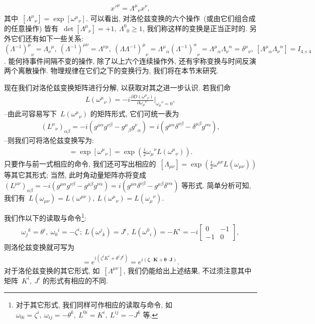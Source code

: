 \begin{align}
x'^\mu={\Lambda^\mu}_\nu x^\nu,
\end{align}
其中~$[{\Lambda^\mu}_\nu]=\exp[{\omega^\mu}_\nu]$.
%
%
可以看出, 对洛伦兹变换的六个操作~(或由它们组合成的任意操作) 皆有~$\det[{\Lambda^\mu}_\nu]=+1,~{\Lambda^0}_0\geq1$, 我们称这样的变换是正当正时的. 另外它们还有如下一些关系: ${(\Lambda^{-1})^\mu}_\nu={\Lambda_\nu}^\mu,~(\Lambda^{-1})^{\mu\nu}=\Lambda^{\nu\mu},~{(\Lambda\Lambda^{-1})^\mu}_\nu=
{\Lambda^\mu}_\alpha{(\Lambda^{-1})^\alpha}_\nu={\Lambda^\mu}_\alpha{\Lambda_\nu}^\alpha={\delta^\mu}_\nu,~[{\Lambda^\mu}_\alpha{\Lambda_\nu}^\alpha]=I_{4\times4}$.
%
能何持事件间隔不变的操作, 除了以上六个连续操作外, 还有宇称变换与时间反演两个离散操作. 物理规律在它们之下的变换行为, 我们将在本节末研究.


现在我们对洛伦兹变换矩阵进行分解, 以获取对其之进一步认识. 若我们命
\begin{gather}
L({\omega^\mu}_\nu)=-i\frac{\partial D({\omega^\mu}_\nu)}{\partial{\omega_\mu}^\nu}\Big|_{{\omega_\mu}^\nu=0},
\end{gather}
--由此可容易写下~$L({\omega^\mu}_\nu)$ 的矩阵形式, 它们可统一表为
\begin{gather}
({L^\mu}_\nu)_{\alpha\beta}=-i(g^{\mu\alpha}g^{\nu\beta}-{g^\mu}_\beta{g^\nu}_\alpha)=i(g^{\mu\alpha}\delta^{\nu\beta}-\delta^{\mu\beta}g^{\nu\alpha}),
\end{gather}
--则我们可将洛伦兹变换写为:
\begin{gather}
[{\Lambda^\mu}_\nu]=\exp[{\omega^\mu}_\nu]=\exp\left(\frac{i}{2}{\omega_\mu}^\nu L({\omega^\mu}_\nu)\right).
\end{gather}
只要作与前一式相应的命令, 我们还可写出相应的~$[\Lambda_{\mu\nu}]=\exp\left(\frac{i}{2}\omega^{\mu\nu} L(\omega_{\mu\nu})\right)$ 等其它其形式; 当然, 此时角动量矩阵亦将变成~$(L^{\mu\nu})_{\alpha\beta}=-i(g^{\mu\alpha}g^{\nu\beta}-g^{\mu\beta}g^{\nu\alpha})=i(g^{\mu\alpha}\delta^{\nu\beta}-g^{\mu\beta}\delta^{\nu\alpha})$ 等形式. 简单分析可知, 我们有~$L(\omega_{\mu\nu})=L(\omega^{\mu\nu}),~L({\omega^\mu}_\nu)=L({\omega_\mu}^\nu)$.

我们作以下的读取与命令\footnote{对于其它形式, 我们同样可作相应的读取与命令, 如~$\omega_{0i}=\zeta^i,~\omega_{ij}=-\theta^k,~L^{0i}=K^i,~L^{ij}=-J^k$ 等.}:
\begin{gather}
{\omega_j}^k=\theta^i,~{\omega_0}^i=-\zeta^i;~L({\omega^j}_k)=J^i,~L({\omega^0}_i)=-K^i=-i\left[\begin{array}{cc}0&-1\\-1&0\end{array}\right],
\end{gather}
则洛伦兹变换就可写为
\begin{gather}
[{\Lambda^\mu}_\nu]=e^{i(\zeta^iK^i+\theta^iJ^i)}=e^{i(\bm{\zeta}\cdot\bm{K}+\bm{\theta}\cdot\bm{J})}.
\end{gather}
对于洛伦兹变换的其它形式, 如~$[\Lambda^{\mu\nu}]$, 我们仍能给出上述结果, 不过须注意其中矩阵~$K^i,~J^i$ 的形式有相应的不同.



